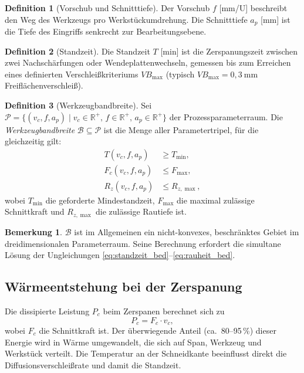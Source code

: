 ﻿\documentclass[a4paper,12pt]{article}
\theoremstyle{definition}
\newtheorem{definition}{Definition}
\newtheorem{bemerkung}{Bemerkung}
\begin{document}
\begin{definition}[Vorschub und Schnitttiefe]
  Der Vorschub $f$ [mm/U] beschreibt den Weg des Werkzeugs pro Werkstückumdrehung.
  Die Schnitttiefe $a_p$ [mm] ist die Tiefe des Eingriffs senkrecht zur
  Bearbeitungsebene.
\end{definition}

\begin{definition}[Standzeit]
  Die Standzeit $T$ [min] ist die Zerspanungszeit zwischen zwei Nachschärfungen
  oder Wendeplattenwechseln, gemessen bis zum Erreichen eines definierten
  Verschleißkriteriums $VB_{\max}$ (typisch $VB_{\max} = 0{,}3~\mathrm{mm}$
  Freiflächenverschleiß).
\end{definition}

\begin{definition}[Werkzeugbandbreite]
\label{def:bandbreite}
  Sei $\mathcal{P} = \{(v_c, f, a_p) \mid v_c \in \mathbb{R}^+,\, f \in \mathbb{R}^+,\,
  a_p \in \mathbb{R}^+\}$ der Prozessparameterraum. Die
  \emph{Werkzeugbandbreite} $\mathcal{B} \subseteq \mathcal{P}$ ist die Menge
  aller Parametertripel, für die gleichzeitig gilt:
  \begin{align}
    T(v_c, f, a_p) &\geq T_{\min}, \label{eq:standzeit_bed} \\
    F_c(v_c, f, a_p) &\leq F_{\max}, \label{eq:kraft_bed} \\
    R_z(v_c, f, a_p) &\leq R_{z,\max}, \label{eq:rauheit_bed}
  \end{align}
  wobei $T_{\min}$ die geforderte Mindestandzeit, $F_{\max}$ die maximal
  zulässige Schnittkraft und $R_{z,\max}$ die zulässige Rautiefe ist.
\end{definition}

\begin{bemerkung}
  $\mathcal{B}$ ist im Allgemeinen ein nicht-konvexes, beschränktes Gebiet im
  dreidimensionalen Parameterraum. Seine Berechnung erfordert die simultane Lösung
  der Ungleichungen \eqref{eq:standzeit_bed}--\eqref{eq:rauheit_bed}.
\end{bemerkung}

\subsection{Wärmeentstehung bei der Zerspanung}

Die dissipierte Leistung $P_c$ beim Zerspanen berechnet sich zu
\[
  P_c = F_c \cdot v_c,
\]
wobei $F_c$ die Schnittkraft ist. Der überwiegende Anteil (ca.\ 80--95\,\%)
dieser Energie wird in Wärme umgewandelt, die sich auf Span, Werkzeug und
Werkstück verteilt. Die Temperatur an der Schneidkante beeinflusst direkt die
Diffusionsverschleißrate und damit die Standzeit.
\end{document}
